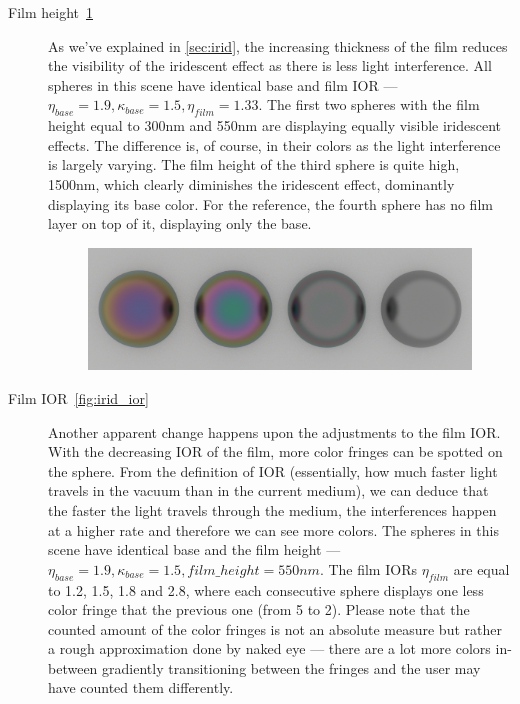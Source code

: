 \begin{description}
	\item[Film height~\ref{fig:irid_height}] As we've explained in \autoref{sec:irid}, the increasing thickness of the film reduces the visibility of the iridescent effect as there is less light interference. All spheres in this scene have identical base and film IOR --- $\eta_{base}=1.9, \kappa_{base}=1.5, \eta_{film}=1.33$. The first two spheres with the film height equal to 300nm and 550nm are displaying equally visible iridescent effects. The difference is, of course, in their colors as the light interference is largely varying. The film height of the third sphere is quite high, 1500nm, which clearly diminishes the iridescent effect, dominantly displaying its base color. For the reference, the fourth sphere has no film layer on top of it, displaying only the base.
	\begin{figure}[H]
		\centering
		\includegraphics[width=.9\linewidth]{img/iridescent_spheres_height.png}
		\caption{}
		\label{fig:irid_height}
	\end{figure}
	\item[Film IOR~\ref{fig:irid_ior}] Another apparent change happens upon the adjustments to the film IOR. With the decreasing IOR of the film, more color fringes can be spotted on the sphere. From the definition of IOR (essentially, how much faster light travels in the vacuum than in the current medium), we can deduce that the faster the light travels through the medium, the interferences happen at a higher rate and therefore we can see more colors. The spheres in this scene have identical base and the film height --- $\eta_{base}=1.9, \kappa_{base}=1.5, film\_height=550nm$. The film IORs $\eta_{film}$ are equal to 1.2, 1.5, 1.8 and 2.8, where each consecutive sphere displays one less color fringe that the previous one (from 5 to 2). Please note that the counted amount of the color fringes is not an absolute measure but rather a rough approximation done by naked eye --- there are a lot more colors in-between gradiently transitioning between the fringes and the user may have counted them differently.
	\begin{figure}[H]

\end{figure}
\end{description}
